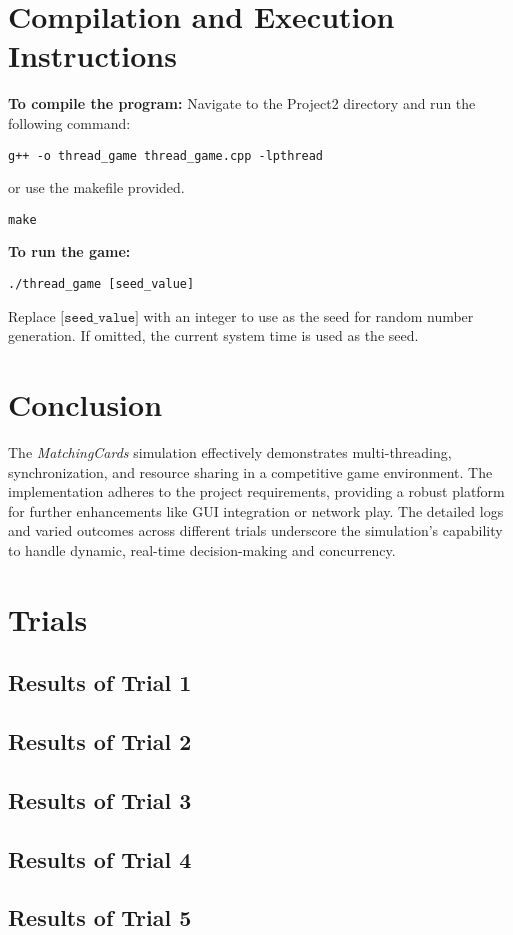 \documentclass{article}
\begin{document}
\section*{Compilation and Execution Instructions}

\textbf{To compile the program:}
Navigate to the Project2 directory and run the following command:
\begin{verbatim}
g++ -o thread_game thread_game.cpp -lpthread
\end{verbatim}
or use the makefile provided.
\begin{verbatim}
make
\end{verbatim}

\textbf{To run the game:}
\begin{verbatim}
./thread_game [seed_value]
\end{verbatim}
Replace $\texttt{[seed\_value]}$ with an integer to use as the seed for random number generation. If omitted, the current system time is used as the seed.

\section*{Conclusion}
The \textit{MatchingCards} simulation effectively demonstrates multi-threading, synchronization, and resource sharing in a competitive game environment. The implementation adheres to the project requirements, providing a robust platform for further enhancements like GUI integration or network play. The detailed logs and varied outcomes across different trials underscore the simulation’s capability to handle dynamic, real-time decision-making and concurrency.

\section*{Trials}
\subsection*{Results of Trial 1}


\subsection*{Results of Trial 2}


\subsection*{Results of Trial 3}


\subsection*{Results of Trial 4}


\subsection*{Results of Trial 5}

\end{document}
